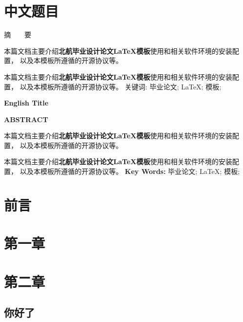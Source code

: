 \documentclass[a4paper,AutoFakeBold,12pt]{ctexbook}
\newcommand\cntitle{中文题目}
\newcommand\entitle{English Title}
\newcommand\cnkeywordsname{关键词}
\newcommand\cnkeywords[1]{ {\noindent\heiti\cnkeywordsname: }#1}
\newcommand\enkeywordsname{Key Words}
\newcommand\enkeywords[1]{ {\noindent\bfseries\enkeywordsname: }#1}
\newenvironment{cnabstract}{%
    \newpage
    \chapter{{\cntitle}}				%
    \centerline{\songti\zihao{-3} 摘~~~~要}%
         \vskip 30pt
        \par
    \setlength{\parindent}{24bp}
    }{}
\newenvironment{enabstract}{%
    \newpage
    \centerline{\bfseries\zihao{-3} \entitle}
    \vskip 10bp
    \centerline{\bfseries\zihao{-3} ABSTRACT}
         \vskip 30bp
        \par
    \setlength{\parindent}{24bp}
    }{}
\begin{document}
\pagestyle{fancy}%
\fancyhead[R,L]{}
\fancyfoot[C]{\thepage}%
\begin{cnabstract}
本篇文档主要介绍{\bf 北航毕业设计论文\LaTeX{}模板}使用和相关软件环境的安装配置，
以及本模板所遵循的开源协议等。

本篇文档主要介绍{\bf 北航毕业设计论文\LaTeX{}模板}使用和相关软件环境的安装配置，
以及本模板所遵循的开源协议等。
\end{cnabstract}
\newline
\cnkeywords{毕业论文; \LaTeX{}; 模板;  }

\begin{enabstract}
本篇文档主要介绍{\bf 北航毕业设计论文\LaTeX{}模板}使用和相关软件环境的安装配置，
以及本模板所遵循的开源协议等。

本篇文档主要介绍{\bf 北航毕业设计论文\LaTeX{}模板}使用和相关软件环境的安装配置，
以及本模板所遵循的开源协议等。
\end{enabstract}
\newline
\enkeywords{毕业论文; \LaTeX{}; 模板;  }


\newpage
\pagestyle{fancy}%
\fancyhead[R,L]{}
\fancyfoot[C]{-\thepage-}
\chapter*{前言}
\chapter{第一章}
\chapter{第二章}
\section{你好了}
\end{document}
